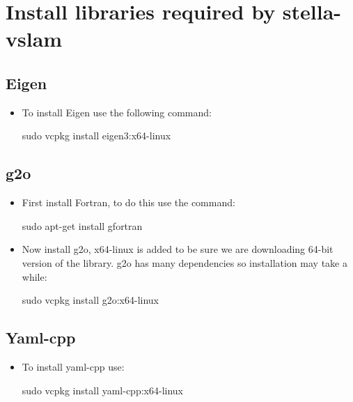 \documentclass[a4paper,12pt]{book}
\begin{document}
\chapter{Install libraries required by stella-vslam}
\section{Eigen}
\begin{itemize}
	\item To install Eigen use the following command:
	
	\vspace{3mm}
	sudo vcpkg install eigen3:x64-linux
	\vspace{3mm}
\end{itemize}
\section{g2o}
\begin{itemize}
	\item First install Fortran, to do this use the command:
	
	\vspace{3mm}
	sudo apt-get install gfortran
	\vspace{3mm}
	
	\item Now install g2o, x64-linux is added to be sure we are downloading 64-bit version of the library. g2o has many dependencies so installation may take a while:
	
	\vspace{3mm}
	sudo vcpkg install g2o:x64-linux
	\vspace{3mm}
\end{itemize}
\section{Yaml-cpp}
\begin{itemize}
	\item To install yaml-cpp use:
	
	\vspace{3mm}
	sudo vcpkg install yaml-cpp:x64-linux
	\vspace{3mm}
\end{itemize}
\end{document}
